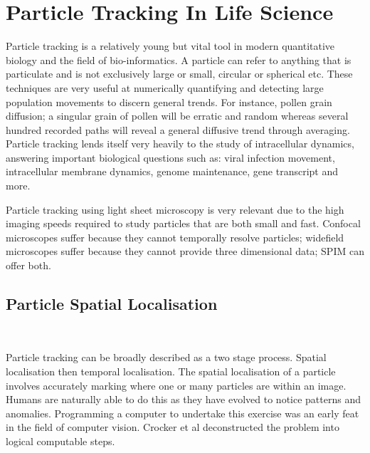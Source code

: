 

\section{Particle Tracking In Life Science}


Particle tracking is a relatively young but vital tool in modern quantitative biology and the field of bio-informatics.
A particle can refer to anything that is particulate and is not exclusively large or small, circular or spherical etc.
These techniques are very useful at numerically quantifying and detecting large population movements to discern general trends.
For instance, pollen grain diffusion; a singular grain of pollen will be erratic and random whereas several hundred recorded paths will reveal a general diffusive trend through averaging.
Particle tracking lends itself very heavily to the study of intracellular dynamics, answering important biological questions such as: viral infection movement\cite{Brandenburg2007}, intracellular membrane dynamics\cite{Chenouard2014}, genome maintenance, gene transcript\cite{Planchon2011} and more\cite{Cognet2014}.

Particle tracking using light sheet microscopy is very relevant due to the high imaging speeds required to study particles that are both small and fast.
Confocal microscopes suffer because they cannot temporally resolve particles; widefield microscopes suffer because they cannot provide three dimensional data; SPIM can offer both.

\subsection{Particle Spatial Localisation}~

Particle tracking can be broadly described as a two stage process.
Spatial localisation then temporal localisation.
The spatial localisation of a particle involves accurately marking where one or many particles are within an image.
Humans are naturally able to do this as they have evolved to notice patterns and anomalies.
Programming a computer to undertake this exercise was an early feat in the field of computer vision\cite{Crocker1996}.
Crocker et al deconstructed the problem into logical computable steps.

